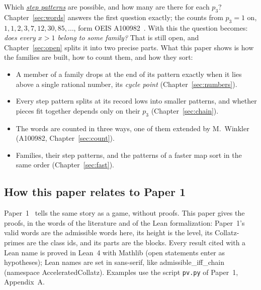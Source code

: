 \documentclass[11pt,a4paper,titlepage]{article}
\newcommand{\keyterm}[2]{\hyperlink{box:#1}{\emph{#2}}}
\newif\ifpaper
\newcommand{\lean}[1]{\textsf{#1}}
\begin{document}
\nopagebreak
Which \keyterm{steppattern}{step patterns} are possible, and how many are there for each $p_3$?
Chapter~\ref{sec:words} answers the first question exactly; the counts
from $p_3 = 1$ on, $1, 1, 2, 3, 7, 12, 30, 85, \dots$, form OEIS A100982~\cite{OEIS_A100982}.
With this the question becomes: \emph{does every $x > 1$ belong to some
family?} That is still open, and Chapter~\ref{sec:open} splits it into two
precise parts. What this paper shows is how the families are built, how to
count them, and how they sort:
{\samepage
\begin{itemize}
\item A member of a family drops at the end of its pattern exactly when it lies above a
  single rational number, its \emph{cycle point} (Chapter~\ref{sec:numbers}).
\item Every step pattern splits at its record lows into smaller patterns, and
  whether pieces fit together depends only on their $p_3$
  (Chapter~\ref{sec:chain}).
\item The words are counted in three ways, one of them extended by M.~Winkler
  (A100982, Chapter~\ref{sec:count}).
\item Families, their step patterns, and the patterns of a faster map
  sort in the same order (Chapter~\ref{sec:fast}).
\end{itemize}}

\ifpaper\clearpage\fi
\subsection*{How this paper relates to Paper 1}

Paper~1~\cite{Paper1} tells the same story as a game, without proofs. This paper
gives the proofs, in the words of the literature and of the Lean formalization:
Paper~1's valid words are the admissible words here, its height is the level, its
Collatz-primes are the class ids, and its parts are the blocks. Every result cited with a Lean name is
proved in Lean~4 with Mathlib (open statements enter as hypotheses); Lean names are set in sans-serif, like
\lean{admissible\_iff\_chain} (namespace \lean{AcceleratedCollatz}). Examples use
the script \texttt{pv.py} of Paper~1, Appendix~A.
\end{document}
